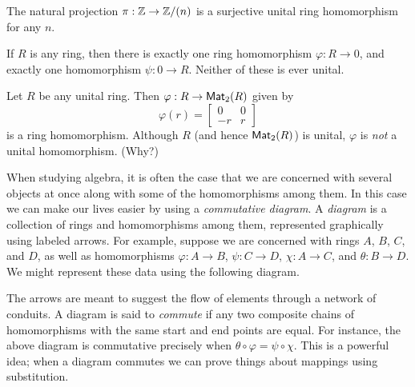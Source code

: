 \begin{examples}
\item The natural projection \(\pi : \mathbb{Z} \rightarrow \mathbb{Z}/(n)\) is a surjective unital ring homomorphism for any \(n\).

\item If \(R\) is any ring, then there is exactly one ring homomorphism \(\varphi : R \rightarrow 0\), and exactly one homomorphism \(\psi : 0 \rightarrow R\). Neither of these is ever unital.

\item Let \(R\) be any unital ring. Then \(\varphi : R \rightarrow \mathsf{Mat}_{2}(R)\) given by \[ \varphi(r) = \begin{bmatrix} 0 & 0 \\ -r & r \end{bmatrix} \] is a ring homomorphism. Although \(R\) (and hence \(\mathsf{Mat}_{2}(R)\)) is unital, \(\varphi\) is \emph{not} a unital homomorphism. (Why?)
\end{examples}

When studying algebra, it is often the case that we are concerned with several objects at once along with some of the homomorphisms among them. In this case we can make our lives easier by using a \emph{commutative diagram}.  A \emph{diagram} is a collection of rings and homomorphisms among them, represented graphically using labeled arrows. For example, suppose we are concerned with rings \(A\), \(B\), \(C\), and \(D\), as well as homomorphisms \(\varphi : A \rightarrow B\), \(\psi : C \rightarrow D\), \(\chi : A \rightarrow C\), and \(\theta : B \rightarrow D\). We might represent these data using the following diagram.
\begin{center}
\end{center}
The arrows are meant to suggest the flow of elements through a network of conduits. A diagram is said to \emph{commute} if any two composite chains of homomorphisms with the same start and end points are equal. For instance, the above diagram is commutative precisely when \(\theta \circ \varphi = \psi \circ \chi\). This is a powerful idea; when a diagram commutes we can prove things about mappings using substitution.

